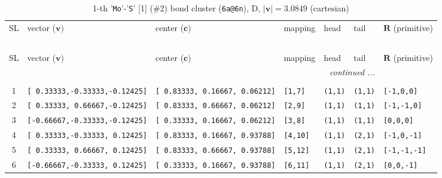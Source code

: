 \documentclass[fleqn,10pt,landscape]{jsarticle}
\begin{document}
\begin{longtable}[l]{cllllll}
\captionsetup{justification=raggedright, singlelinecheck=off}
\caption{1-th '\texttt{Mo}'-'\texttt{S}' [1] (\#2) bond cluster (\texttt{6a@6n}), D, $|\bm{v}|=3.0849$ (cartesian)}
 \\
 \hline \hline
SL & vector ($\bm{v})$ & center ($\bm{c})$ & mapping & head & tail & $\bm{R}$ (primitive) \\ \hline \endfirsthead

\multicolumn{6}{l}{\tablename\ \thetable{}} \\
 \hline \hline
SL & vector ($\bm{v})$ & center ($\bm{c})$ & mapping & head & tail & $\bm{R}$ (primitive) \\ \hline \endhead

 \hline \hline
\multicolumn{6}{r}{\footnotesize\it continued ...} \\ \endfoot

 \hline \hline
\multicolumn{6}{r}{} \\ \endlastfoot

1 & \texttt{[ 0.33333,-0.33333,-0.12425]} & \texttt{[ 0.83333, 0.16667, 0.06212]} & \texttt{[1,7]} & \texttt{(1,1)} & \texttt{(1,1)} & \texttt{[-1,0,0]} \\ \hline
2 & \texttt{[ 0.33333, 0.66667,-0.12425]} & \texttt{[ 0.83333, 0.66667, 0.06212]} & \texttt{[2,9]} & \texttt{(1,1)} & \texttt{(1,1)} & \texttt{[-1,-1,0]} \\ \hline
3 & \texttt{[-0.66667,-0.33333,-0.12425]} & \texttt{[ 0.33333, 0.16667, 0.06212]} & \texttt{[3,8]} & \texttt{(1,1)} & \texttt{(1,1)} & \texttt{[0,0,0]} \\ \hline
4 & \texttt{[ 0.33333,-0.33333, 0.12425]} & \texttt{[ 0.83333, 0.16667, 0.93788]} & \texttt{[4,10]} & \texttt{(1,1)} & \texttt{(2,1)} & \texttt{[-1,0,-1]} \\ \hline
5 & \texttt{[ 0.33333, 0.66667, 0.12425]} & \texttt{[ 0.83333, 0.66667, 0.93788]} & \texttt{[5,12]} & \texttt{(1,1)} & \texttt{(2,1)} & \texttt{[-1,-1,-1]} \\ \hline
6 & \texttt{[-0.66667,-0.33333, 0.12425]} & \texttt{[ 0.33333, 0.16667, 0.93788]} & \texttt{[6,11]} & \texttt{(1,1)} & \texttt{(2,1)} & \texttt{[0,0,-1]} \\
\end{longtable}
\renewcommand{\arraystretch}{1.6}
\end{document}
